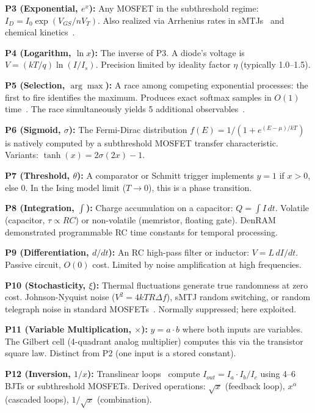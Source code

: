 \documentclass[11pt]{article}
\begin{document}
\textbf{P3 (Exponential, $e^x$):} Any MOSFET in the subthreshold regime: $I_D = I_0 \exp(V_{GS}/nV_T)$. Also realized via Arrhenius rates in sMTJs~\cite{bieg2025} and chemical kinetics~\cite{bieg2026}.

\textbf{P4 (Logarithm, $\ln x$):} The inverse of P3. A diode's voltage is $V = (kT/q)\ln(I/I_s)$. Precision limited by ideality factor $\eta$ (typically 1.0--1.5).

\textbf{P5 (Selection, $\arg\max$):} A race among competing exponential processes: the first to fire identifies the maximum. Produces exact softmax samples in $O(1)$ time~\cite{bieg2025}. The race simultaneously yields 5 additional observables~\cite{bieg2026}.

\textbf{P6 (Sigmoid, $\sigma$):} The Fermi-Dirac distribution $f(E) = 1/(1 + e^{(E-\mu)/kT})$ is natively computed by a subthreshold MOSFET transfer characteristic. Variants: $\tanh(x) = 2\sigma(2x) - 1$.

\textbf{P7 (Threshold, $\theta$):} A comparator or Schmitt trigger implements $y = 1$ if $x > 0$, else $0$. In the Ising model limit ($T \to 0$), this is a phase transition.

\textbf{P8 (Integration, $\int$):} Charge accumulation on a capacitor: $Q = \int I\,dt$. Volatile (capacitor, $\tau \propto RC$) or non-volatile (memristor, floating gate). DenRAM~\cite{denram2024} demonstrated programmable RC time constants for temporal processing.

\textbf{P9 (Differentiation, $d/dt$):} An RC high-pass filter or inductor: $V = L\,dI/dt$. Passive circuit, $O(0)$ cost. Limited by noise amplification at high frequencies.

\textbf{P10 (Stochasticity, $\xi$):} Thermal fluctuations generate true randomness at zero cost. Johnson-Nyquist noise ($V^2 = 4kTR\Delta f$), sMTJ random switching, or random telegraph noise in standard MOSFETs~\cite{cryptoristor2024}. Normally suppressed; here exploited.

\textbf{P11 (Variable Multiplication, $\times$):} $y = a \cdot b$ where both inputs are variables. The Gilbert cell (4-quadrant analog multiplier) computes this via the transistor square law. Distinct from P2 (one input is a stored constant).

\textbf{P12 (Inversion, $1/x$):} Translinear loops~\cite{gilbert1975} compute $I_{out} = I_a \cdot I_b / I_c$ using 4--6 BJTs or subthreshold MOSFETs. Derived operations: $\sqrt{x}$ (feedback loop), $x^\alpha$ (cascaded loops), $1/\sqrt{x}$ (combination).
\end{document}
